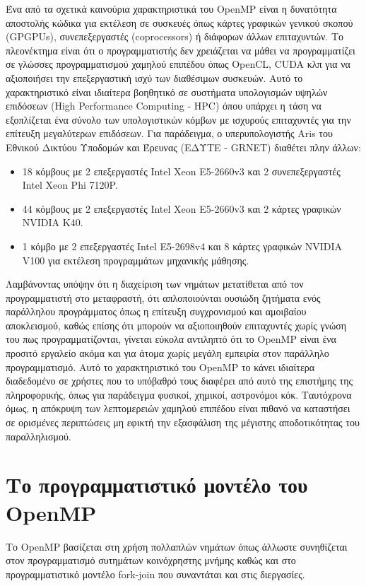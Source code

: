 Ένα από τα σχετικά καινούρια χαρακτηριστικά του OpenMP είναι η δυνατότητα αποστολής κώδικα για εκτέλεση σε συσκευές όπως κάρτες γραφικών γενικού σκοπού (GPGPUs), συνεπεξεργαστές (coprocessors) ή διάφορων άλλων επιταχυντών. Το πλεονέκτημα είναι ότι ο προγραμματιστής δεν χρειάζεται να μάθει να προγραμματίζει σε γλώσσες προγραμματισμού χαμηλού επιπέδου όπως OpenCL, CUDA κλπ για να αξιοποιήσει την επεξεργαστική ισχύ των διαθέσιμων συσκευών. Αυτό το χαρακτηριστικό είναι ιδιαίτερα βοηθητικό σε συστήματα υπολογισμών υψηλών επιδόσεων (High Performance Computing - HPC) όπου υπάρχει η τάση να εξοπλίζεται ένα σύνολο των υπολογιστικών κόμβων με ισχυρούς επιταχυντές για την επίτευξη μεγαλύτερων επιδόσεων. Για παράδειγμα, ο υπερυπολογιστής Aris του Εθνικού Δικτύου Υποδομών και Έρευνας (ΕΔΥΤΕ - GRNET) διαθέτει πλην άλλων:
\begin{itemize}
	\item 18 κόμβους με 2 επεξεργαστές Intel Xeon E5-2660v3 και 2 συνεπεξεργαστές Intel Xeon Phi 7120P.
	\item 44 κόμβους με 2 επεξεργαστές Intel Xeon E5-2660v3 και 2 κάρτες γραφικών NVIDIA K40.
	\item 1 κόμβο με 2 επεξεργαστές Intel E5-2698v4 και 8 κάρτες γραφικών NVIDIA V100 για εκτέλεση προγραμμάτων μηχανικής μάθησης.
\end{itemize}

Λαμβάνοντας υπόψην ότι η διαχείριση των νημάτων μετατίθεται από τον προγραμματιστή στο μεταφραστή, ότι απλοποιούνται ουσιώδη ζητήματα ενός παράλληλου προγράμματος όπως η επίτευξη συγχρονισμού και αμοιβαίου αποκλεισμού, καθώς επίσης ότι μπορούν να αξιοποιηθούν επιταχυντές χωρίς γνώση του πως προγραμματίζονται, γίνεται εύκολα αντιληπτό ότι το OpenMP είναι ένα προσιτό εργαλείο ακόμα και για άτομα χωρίς μεγάλη εμπειρία στον παράλληλο προγραμματισμό. Αυτό το χαρακτηριστικό του OpenMP το κάνει ιδιαίτερα διαδεδομένο σε χρήστες που το υπόβαθρό τους διαφέρει από αυτό της επιστήμης της πληροφορικής, όπως για παράδειγμα φυσικοί, χημικοί, αστρονόμοι κόκ. Ταυτόχρονα όμως, η απόκρυψη των λεπτομερειών χαμηλού επιπέδου είναι πιθανό να καταστήσει σε ορισμένες περιπτώσεις μη εφικτή την εξασφάλιση της μέγιστης αποδοτικότητας του παραλληλισμού.

\section{Το προγραμματιστικό μοντέλο του OpenMP}
Το OpenMP βασίζεται στη χρήση πολλαπλών νημάτων όπως άλλωστε συνηθίζεται στον προγραμματισμό συτημάτων κοινόχρηστης μνήμης καθώς και στο προγραμματιστικό μοντέλο fork-join που συναντάται και στις διεργασίες.


